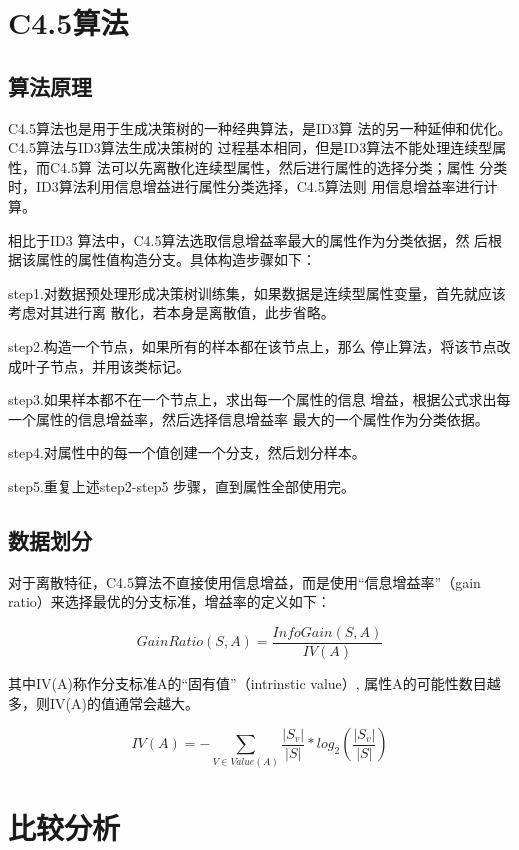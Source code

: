\documentclass[11pt,a4paper]{article}
\begin{document}
\section{C4.5算法}
\subsection{算法原理}

C4.5算法也是用于生成决策树的一种经典算法，是ID3算
法的另一种延伸和优化。C4.5算法与ID3算法生成决策树的
过程基本相同，但是ID3算法不能处理连续型属性，而C4.5算
法可以先离散化连续型属性，然后进行属性的选择分类；属性
分类时，ID3算法利用信息增益进行属性分类选择，C4.5算法则
用信息增益率进行计算。

相比于ID3 算法中，C4.5算法选取信息增益率最大的属性作为分类依据，然
后根据该属性的属性值构造分支。具体构造步骤如下：

step1.对数据预处理形成决策树训练集，如果数据是连续型属性变量，首先就应该考虑对其进行离
散化，若本身是离散值，此步省略。

step2.构造一个节点，如果所有的样本都在该节点上，那么
停止算法，将该节点改成叶子节点，并用该类标记。

step3.如果样本都不在一个节点上，求出每一个属性的信息
增益，根据公式求出每一个属性的信息增益率，然后选择信息增益率
最大的一个属性作为分类依据。

step4.对属性中的每一个值创建一个分支，然后划分样本。

step5.重复上述step2-step5 步骤，直到属性全部使用完。

\subsection{数据划分}

对于离散特征，C4.5算法不直接使用信息增益，而是使用“信息增益率”（gain ratio）\cite{r7}来选择最优的分支标准，增益率的定义如下：


$$GainRatio(S, A) = \frac{InfoGain(S, A)}{IV(A)}$$

其中IV(A)称作分支标准A的“固有值”（intrinstic value）, 属性A的可能性数目越多，则IV(A)的值通常会越大。

$$IV(A) = -\sum_{V\in Value(A)}  \frac{|S_v|}{|S|} * log_2(\frac{|S_v|}{|S|})$$

\section{比较分析}
\end{document}
